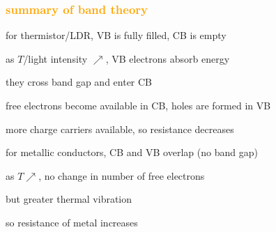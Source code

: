 \documentclass[12pt,xcolor=svgnames,handout]{beamer}
\newcommand{\tightframetitle}[1]{ %
\frametitle{#1}\vspace{-.6\baselineskip}}
\begin{document}
\begin{frame}
\tightframetitle{\textcolor{orange}{summary of band theory}}

\begin{block}{}		
	for thermistor/LDR, VB is fully filled, CB is empty
	
	as $T$/light intensity $\nearrow$, VB electrons absorb energy
	
	they cross band gap and enter CB
	
	free electrons become available in CB, holes are formed in VB
	
	more charge carriers available, so resistance decreases
\end{block}

\begin{block}{}
	for metallic conductors, CB and VB overlap (no band gap)
	
	as $T\nearrow$, no change in number of free electrons
	
	but greater thermal vibration
	
	so resistance of metal increases
\end{block}

\end{frame}


\end{document}
